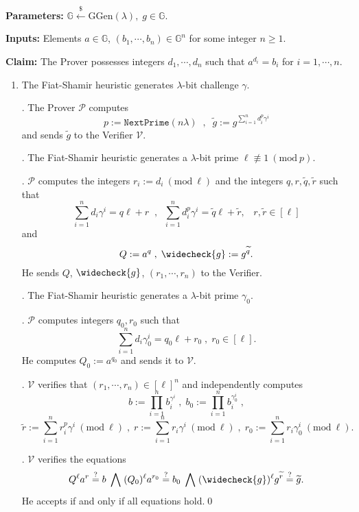 \documentclass[11pt, lettersize, notitlepage, leqno, footskip=0.6cm]{article}
\newcommand{\slim}{\sum\limits}
\newcommand{\ttt}{\texttt}
\newcommand{\wti}{\widetilde}
\newcommand{\mc}{\mathcal}
\newcommand{\mb}{\mathbb}
\newcommand{\mr}{\mathrm}
\newcommand{\lam}{\lambda}
\newcommand{\lamb}{\lambda}
\newcommand{\weck}{\widecheck}
\newcommand{\mP}{\mc{P}}
\newcommand{\V}{\mc{V}}
\newcommand{\vs}{\vspace{-0.15cm}}
\newcommand{\noin}{\noindent}
\newcommand{\sta}{\stackrel{?}{=}}
\newcommand{\Mod}[1]{\ (\mathrm{mod}\ #1)}
\numberwithin{equation}{section}
\begin{document}
\noindent \textbf{Parameters:} $\mb{G}\xleftarrow{\$} \mr{GGen}(\lamb), \; g\in \mb{G}$.

\noindent \textbf{Inputs:} Elements $a\in\mb{G} $, $(b_1,\cdots,b_n)\in \mb{G}^n$ for some integer $n\geq 1$.

\noindent \textbf{Claim:} The Prover possesses integers $d_1,\cdots, d_n$ such that $a^{d_i} = b_i$ for $i = 1,\cdots, n$.

\begin{enumerate}[wide, labelwidth=!, labelindent=0pt]\vs \item \normalfont The Fiat-Shamir heuristic generates $\lamb$-bit challenge $\gamma$.

\noin 2. The Prover $\mc{P}$ computes \vs $$p:= \ttt{NextPrime}(n\lam)\;\;,\;\;\wti{g} := g^{\sum\limits_{i=1}^n d_i^{p}\gamma^i}$$ and sends $\wti{g}$ to the Verifier $\mc{V}$.


\noin 3. The Fiat-Shamir heuristic generates a $\lam$-bit prime $\ell\not\equiv 1\Mod{p}$. 

\noin 4. $\mc{P}$ computes the integers $r_i:= d_i\Mod{\ell}$ and the integers $q, r,\wti{q},\wti{r}$ such that \vs $$\slim_{i=1}^n d_i\gamma^i = q\ell+r\;\;,\;\; \slim_{i=1}^n d_i^{p}\gamma^i = \wti{q}\ell+\wti{r},\;\;\;r,\wti{r}\in[\ell]$$ and \vs $$Q:= a^q\;,\; \weck{g}:= g^{\wti{q}}.$$ He sends $Q$, $\weck{g}$, $(r_1,\cdots,r_n)$ to the Verifier.

\noin 5. The Fiat-Shamir heuristic generates a $\lam$-bit prime $\gamma_0$.

\noin 6. $\mP$ computes integers $q_0, r_0$ such that \vs $$\slim_{i=1}^n d_i\gamma_0^i = q_0\ell+r_0\;,\;r_0\in[\ell] .$$ He computes $Q_0:= a^{q_0}$ and sends it to $\V.$

. $\mc{V}$ verifies that $(r_1,\cdots,r_n)\in [\ell]^n$ and independently computes \vs $$b := \prod\limits_{i=1}^n b_i^{\gamma^i}\;,\;b_0 := \prod\limits_{i=1}^n b_i^{\gamma_0^i}\;,$$ \vspace{-0.2cm} $$\wti{r}:= \slim_{i=1}^n r_i^{p}\gamma^i\Mod{\ell}\;,\;r:= \slim_{i=1}^n r_i\gamma^i\Mod{\ell}\;,\;r_0:=\slim_{i=1}^n r_i\gamma_0^i\Mod{\ell}.$$ 

\noin 8. $\V$ verifies the equations \vs $$Q^{\ell}a^r\sta b\;\bigwedge\;(Q_0)^{\ell}a^{r_0}\sta b_0\;\bigwedge\; (\weck{g})^{\ell}g^{\wti{r}}\sta\wti{g}.$$ He accepts if and only if all equations hold.\qed  \end{enumerate}
\end{document}
